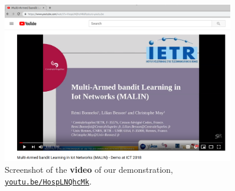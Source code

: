 \begin{figure}[!h]
	\centering
    \includegraphics[width=0.90\textwidth]{2-Chapters/4-Chapter/Images/screenshotDemoYouTube.png}
    \caption{Screenshot of the \textbf{video} of our demonstration, \texttt{\href{https://youtu.be/HospLNQhcMk}{youtu.be/HospLNQhcMk}}.}
    \label{fig:42:screenshotDemoYouTube}
\end{figure}

